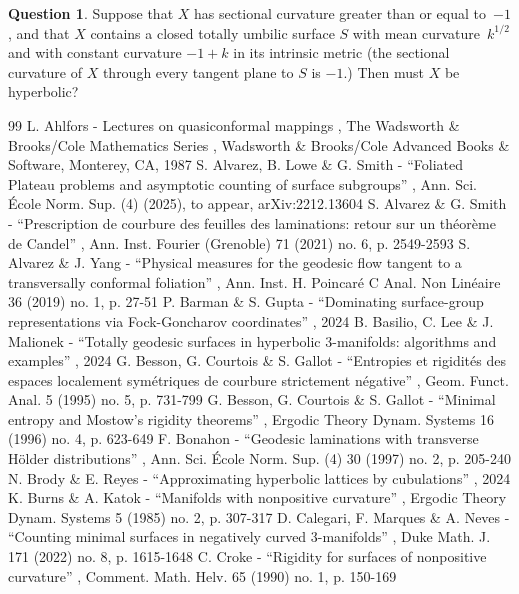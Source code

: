 \documentclass[10pt]{amsart}
\theoremstyle{plain}
\theoremstyle{definition}
\newtheorem{question}[theorem]{Question}
\begin{document}
\begin{question}
Suppose that $X$ has sectional curvature greater than or equal to~$-1$, and that $X$ contains a closed totally umbilic surface $S$ with mean curvature~$k^{1/2}$ and with constant curvature $-1 +k$ in its intrinsic metric (\ie the sectional curvature of $X$ through every tangent plane to $S$ is $-1$.) Then must $X$ be hyperbolic?
\end{question}


\begin{thebibliography}{99}
 L. Ahlfors - Lectures on quasiconformal mappings , The Wadsworth \& Brooks/Cole Mathematics Series , Wadsworth \& Brooks/Cole Advanced Books \& Software, Monterey, CA, 1987
 S. Alvarez, B. Lowe \& G. Smith - “Foliated Plateau problems and asymptotic counting of surface subgroups” , Ann. Sci. École Norm. Sup. (4) (2025), to appear, arXiv:2212.13604
 S. Alvarez \& G. Smith - “Prescription de courbure des feuilles des laminations: retour sur un théorème de Candel” , Ann. Inst. Fourier (Grenoble) 71 (2021) no. 6, p. 2549-2593
 S. Alvarez \& J. Yang - “Physical measures for the geodesic flow tangent to a transversally conformal foliation” , Ann. Inst. H. Poincaré C Anal. Non Linéaire 36 (2019) no. 1, p. 27-51
 P. Barman \& S. Gupta - “Dominating surface-group representations via Fock-Goncharov coordinates” , 2024
 B. Basilio, C. Lee \& J. Malionek - “Totally geodesic surfaces in hyperbolic 3-manifolds: algorithms and examples” , 2024
 G. Besson, G. Courtois \& S. Gallot - “Entropies et rigidités des espaces localement symétriques de courbure strictement négative” , Geom. Funct. Anal. 5 (1995) no. 5, p. 731-799
 G. Besson, G. Courtois \& S. Gallot - “Minimal entropy and Mostow’s rigidity theorems” , Ergodic Theory Dynam. Systems 16 (1996) no. 4, p. 623-649
 F. Bonahon - “Geodesic laminations with transverse Hölder distributions” , Ann. Sci. École Norm. Sup. (4) 30 (1997) no. 2, p. 205-240
 N. Brody \& E. Reyes - “Approximating hyperbolic lattices by cubulations” , 2024
 K. Burns \& A. Katok - “Manifolds with nonpositive curvature” , Ergodic Theory Dynam. Systems 5 (1985) no. 2, p. 307-317
 D. Calegari, F. Marques \& A. Neves - “Counting minimal surfaces in negatively curved 3-manifolds” , Duke Math. J. 171 (2022) no. 8, p. 1615-1648
 C. Croke - “Rigidity for surfaces of nonpositive curvature” , Comment. Math. Helv. 65 (1990) no. 1, p. 150-169

\end{thebibliography}
\end{document}
